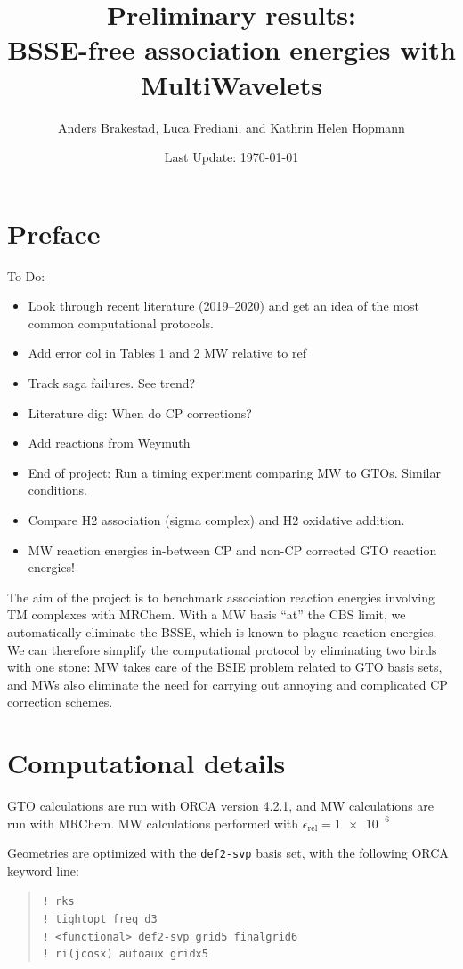 \documentclass[11pt,a4paper]{article}
\author{Anders Brakestad, Luca Frediani, and Kathrin Helen Hopmann}
\title{Preliminary results: \\ BSSE-free association energies with MultiWavelets}
\date{Last Update: \today}
\begin{document}
	\maketitle
	\tableofcontents

\setcounter{secnumdepth}{2}

\section{Preface}

To Do:
\begin{itemize}
	\item Look through recent literature (2019--2020) and get an idea of the most common computational protocols. 
	\item Add error col in Tables 1 and 2 MW relative to ref
	\item Track saga failures. See trend?
	\item Literature dig: When do CP corrections?
	\item Add reactions from Weymuth
	\item End of project: Run a timing experiment comparing MW to GTOs. Similar conditions.
	\item Compare H2 association (sigma complex) and H2 oxidative addition.
	\item MW reaction energies in-between CP and non-CP corrected GTO reaction energies!
\end{itemize}

The aim of the project is to benchmark association reaction energies involving TM complexes with MRChem.
With a MW basis ``at'' the CBS limit, we automatically eliminate the BSSE, which is known to plague reaction energies.
We can therefore simplify the computational protocol by eliminating two birds with one stone: MW takes care of the BSIE problem related to GTO basis sets, and MWs also eliminate the need for carrying out annoying and complicated CP correction schemes.


\section{Computational details}
GTO calculations are run with ORCA version 4.2.1, and MW calculations are run with MRChem.
MW calculations performed with $\epsilon_{\text{rel}} = \num{1e-6}$

Geometries are optimized with the \verb|def2-svp| basis set, with the following ORCA keyword line:

\begin{quote}
	\verb|! rks| \\
	\verb|! tightopt freq d3| \\
	\verb|! <functional> def2-svp grid5 finalgrid6| \\ 
	\verb|! ri(jcosx) autoaux gridx5|
\end{quote}
\end{document}
